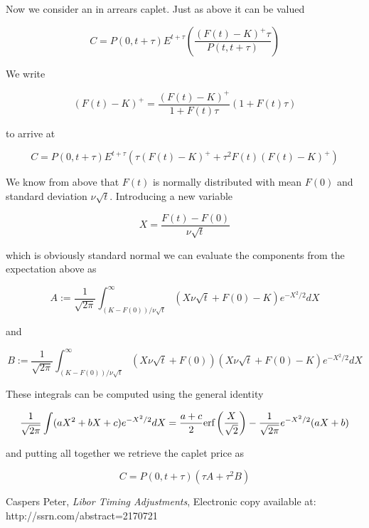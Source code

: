 \documentclass{amsart}
\theoremstyle{plain}
\numberwithin{equation}{section}
\begin{document}
Now we consider an in arrears caplet. Just as above it can be valued

\begin{equation}
C = P(0,t+\tau)E^{t+\tau} \left( \frac{ (F(t)-K)^+ \tau } { P(t, t+\tau)} \right)
\end{equation}

We write

\begin{equation}
(F(t)-K)^+ = \frac{(F(t)-K)^+}{1+F(t)\tau}(1+F(t)\tau)
\end{equation}

to arrive at

\begin{equation}
C=P(0,t+\tau)E^{t+\tau} ( \tau(F(t)-K)^+ + \tau^2 F(t)(F(t)-K)^+ )
\end{equation}

We know from above that $F(t)$ is normally distributed with mean $F(0)$ and standard deviation $\nu\sqrt{t}$. Introducing a new variable

\begin{equation}
X = \frac{F(t)-F(0)}{\nu\sqrt{t}}
\end{equation}

which is obviously standard normal we can evaluate the components from the expectation above as

\begin{equation}
A :=\frac{1}{\sqrt{2\pi}} \int_{(K-F(0))/\nu\sqrt{t}}^\infty (X\nu\sqrt{t}+F(0)-K) e^{-X^2/2} dX
\end{equation}

and

\begin{equation}
B := \frac{1}{\sqrt{2\pi}} \int_{(K-F(0))/\nu\sqrt{t}}^\infty (X\nu\sqrt{t}+F(0))(X\nu\sqrt{t}+F(0)-K) e^{-X^2/2} dX
\end{equation}

These integrals can be computed using the general identity

\begin{equation}
\frac{1}{\sqrt{2\pi}} \int (aX^2+bX+c)e^{-X^2/2}dX = \frac{a+c}{2} \textnormal{erf}\left(\frac{X}{\sqrt{2}}\right) - \frac{1}{\sqrt{2\pi}}e^{-X^2/2}(aX+b)
\end{equation}

and putting all together we retrieve the caplet price as

\begin{equation}
C=P(0,t+\tau) ( \tau A + \tau^2 B )
\end{equation}


\begin{thebibliography}{2}

Caspers Peter, \textit{Libor Timing Adjustments},
Electronic copy available at: http://ssrn.com/abstract=2170721

\end{thebibliography}
\end{document}
